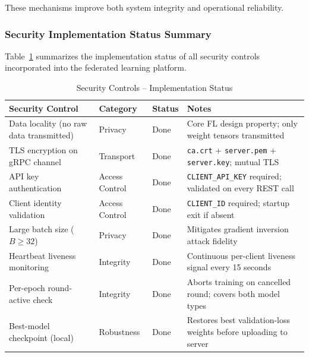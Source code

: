 These mechanisms improve both system integrity and operational reliability.

\subsubsection{Security Implementation Status Summary}

Table~\ref{tab:security_controls} summarizes the implementation status of all security controls incorporated into the federated learning platform.

\begin{table}[H]
	\centering
	\caption{Security Controls -- Implementation Status}
	\label{tab:security_controls}
	\renewcommand{\arraystretch}{1.2}
	\begin{tabularx}{\textwidth}{|p{3.8cm}|p{2cm}|p{1.8cm}|X|}
		\hline
		\textbf{Security Control} &
		\textbf{Category} &
		\textbf{Status} &
		\textbf{Notes} \\
		\hline
		
		Data locality (no raw data transmitted) &
		Privacy &
		Done &
		Core FL design property; only weight tensors transmitted \\
		\hline
		
		TLS encryption on gRPC channel &
		Transport &
		Done &
		\texttt{ca.crt} + \texttt{server.pem} + \texttt{server.key}; mutual TLS \\
		\hline
		
		API key authentication &
		Access Control &
		Done &
		\texttt{CLIENT\_API\_KEY} required; validated on every REST call \\
		\hline
		
		Client identity validation &
		Access Control &
		Done &
		\texttt{CLIENT\_ID} required; startup exit if absent \\
		\hline
		
		Large batch size ($B \geq 32$) &
		Privacy &
		Done &
		Mitigates gradient inversion attack fidelity \\
		\hline
		
		Heartbeat liveness monitoring &
		Integrity &
		Done &
		Continuous per-client liveness signal every 15 seconds \\
		\hline
		
		Per-epoch round-active check &
		Integrity &
		Done &
		Aborts training on cancelled round; covers both model types \\
		\hline
		
		Best-model checkpoint (local) &
		Robustness &
		Done &
		Restores best validation-loss weights before uploading to server \\
		\hline
		

\end{tabularx}
\end{table}
